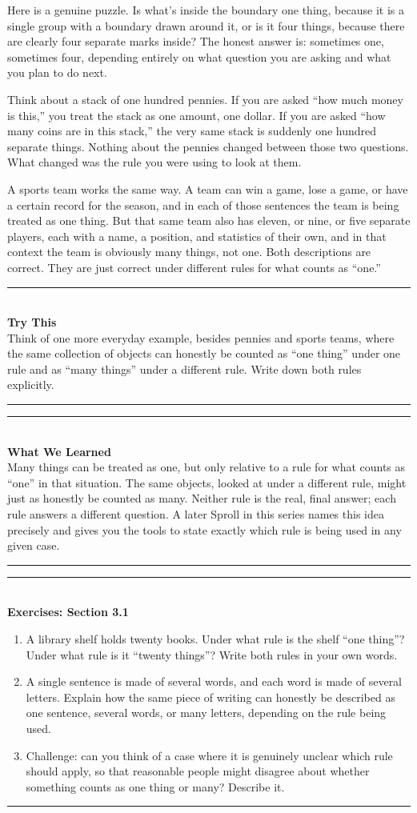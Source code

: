 \documentclass[11pt]{book}
\newenvironment{exercisebox}[1]{%
\vspace{0.8em}\noindent\rule{\linewidth}{0.6pt}\\[0.2em]\textbf{Exercises: #1}\\[0.3em]%
\begin{enumerate}[label=\arabic*., itemsep=0.4em]}%
{\end{enumerate}\noindent\rule{\linewidth}{0.6pt}\vspace{0.6em}}
\newenvironment{trythis}{%
\vspace{0.6em}\noindent\rule{\linewidth}{0.6pt}\\[0.2em]\textbf{Try This}\\[0.3em]}%
{\\[0.2em]\noindent\rule{\linewidth}{0.6pt}\vspace{0.6em}}
\newenvironment{summarybox}{%
\vspace{0.6em}\noindent\rule{\linewidth}{0.6pt}\\[0.2em]\textbf{What We Learned}\\[0.3em]}%
{\\[0.2em]\noindent\rule{\linewidth}{0.6pt}\vspace{0.6em}}
\begin{document}
Here is a genuine puzzle. Is what's inside the boundary one thing, because it is a single group with a boundary drawn around it, or is it four things, because there are clearly four separate marks inside? The honest answer is: sometimes one, sometimes four, depending entirely on what question you are asking and what you plan to do next.

Think about a stack of one hundred pennies. If you are asked ``how much money is this,'' you treat the stack as one amount, one dollar. If you are asked ``how many coins are in this stack,'' the very same stack is suddenly one hundred separate things. Nothing about the pennies changed between those two questions. What changed was the rule you were using to look at them.

A sports team works the same way. A team can win a game, lose a game, or have a certain record for the season, and in each of those sentences the team is being treated as one thing. But that same team also has eleven, or nine, or five separate players, each with a name, a position, and statistics of their own, and in that context the team is obviously many things, not one. Both descriptions are correct. They are just correct under different rules for what counts as ``one.''

\begin{trythis}
Think of one more everyday example, besides pennies and sports teams, where the same collection of objects can honestly be counted as ``one thing'' under one rule and as ``many things'' under a different rule. Write down both rules explicitly.
\end{trythis}

\begin{summarybox}
Many things can be treated as one, but only relative to a rule for what counts as ``one'' in that situation. The same objects, looked at under a different rule, might just as honestly be counted as many. Neither rule is the real, final answer; each rule answers a different question. A later Sproll in this series names this idea precisely and gives you the tools to state exactly which rule is being used in any given case.
\end{summarybox}

\begin{exercisebox}{Section 3.1}
\item A library shelf holds twenty books. Under what rule is the shelf ``one thing''? Under what rule is it ``twenty things''? Write both rules in your own words.
\item A single sentence is made of several words, and each word is made of several letters. Explain how the same piece of writing can honestly be described as one sentence, several words, or many letters, depending on the rule being used.
\item Challenge: can you think of a case where it is genuinely unclear which rule should apply, so that reasonable people might disagree about whether something counts as one thing or many? Describe it.
\end{exercisebox}
\end{document}
